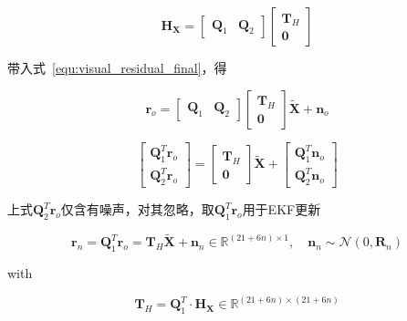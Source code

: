 \documentclass[12pt,a4paper]{article}
\begin{document}
\begin{equation}
\mathbf{H}_{\mathbf{X}}=\left[\begin{array}{ll}{\mathbf{Q}_{1}} & {\mathbf{Q}_{2}}\end{array}\right]\left[\begin{array}{c}{\mathbf{T}_{H}} \\ {\mathbf{0}}\end{array}\right]
\end{equation}

带入式~\eqref{equ:visual_residual_final}，得

\begin{equation}
\mathbf{r}_{o}=\left[\begin{array}{ll}{\mathbf{Q}_{1}} & {\mathbf{Q}_{2}}\end{array}\right]\left[\begin{array}{c}{\mathbf{T}_{H}} \\ {\mathbf{0}}\end{array}\right] \tilde{\mathbf{X}}+\mathbf{n}_{o}
\end{equation}

\begin{equation}
\left[\begin{array}{l}
{\mathbf{Q}_{1}^{T} \mathbf{r}_{o}} \\ {\mathbf{Q}_{2}^{T} \mathbf{r}_{o}}\end{array}\right]=\left[\begin{array}{c}{\mathbf{T}_{H}} \\ {\mathbf{0}}\end{array}\right] \tilde{\mathbf{X}}+\left[\begin{array}{l}{\mathbf{Q}_{1}^{T} \mathbf{n}_{o}} \\ {\mathbf{Q}_{2}^{T} \mathbf{n}_{o}}\end{array}\right]
\end{equation}

上式${\mathbf{Q}_{2}^{T} \mathbf{r}_{o}}$仅含有噪声，对其忽略，取$\mathbf{Q}_{1}^{T} \mathbf{r}_{o}$用于EKF更新

\begin{equation}
\mathbf{r}_{n}=\mathbf{Q}_{1}^{T} \mathbf{r}_{o}=\mathbf{T}_{H} \widetilde{\mathbf{X}}+\mathbf{n}_{n}
\in \mathbb{R}^{(21+6n) \times 1}
, \quad
\mathbf{n}_{n} \sim \mathcal{N}(0, \mathbf{R}_{n})
\end{equation}

with

\begin{equation}
\mathbf{T}_{H} = \mathbf{Q}_{1}^{T} \cdot \mathbf{H}_{\mathbf{X}} 
\in \mathbb{R}^{(21+6n) \times (21+6n)}
\end{equation}
\end{document}
